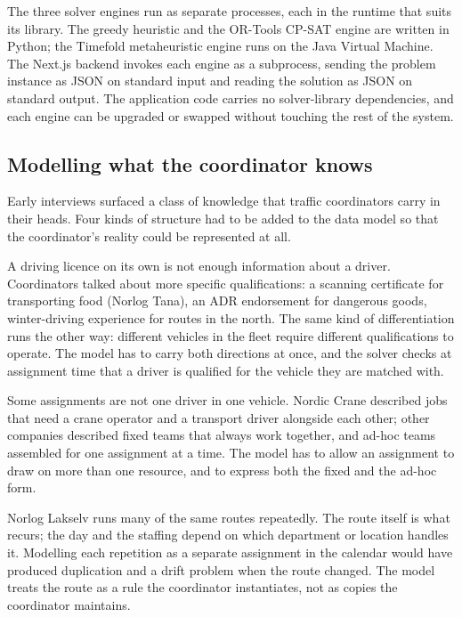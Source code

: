 The three solver engines run as separate processes, each in the runtime that suits its library. The greedy heuristic and the OR-Tools CP-SAT engine are written in Python; the Timefold metaheuristic engine runs on the Java Virtual Machine. The Next.js backend invokes each engine as a subprocess, sending the problem instance as JSON on standard input and reading the solution as JSON on standard output. The application code carries no solver-library dependencies, and each engine can be upgraded or swapped without touching the rest of the system.

\subsection{Modelling what the coordinator knows}
\label{sec:data-modelling}

Early interviews surfaced a class of knowledge that traffic coordinators carry in their heads. Four kinds of structure had to be added to the data model so that the coordinator's reality could be represented at all.

A driving licence on its own is not enough information about a driver. Coordinators talked about more specific qualifications: a scanning certificate for transporting food (Norlog Tana), an ADR endorsement for dangerous goods, winter-driving experience for routes in the north. The same kind of differentiation runs the other way: different vehicles in the fleet require different qualifications to operate. The model has to carry both directions at once, and the solver checks at assignment time that a driver is qualified for the vehicle they are matched with.

Some assignments are not one driver in one vehicle. Nordic Crane described jobs that need a crane operator and a transport driver alongside each other; other companies described fixed teams that always work together, and ad-hoc teams assembled for one assignment at a time. The model has to allow an assignment to draw on more than one resource, and to express both the fixed and the ad-hoc form.

Norlog Lakselv runs many of the same routes repeatedly. The route itself is what recurs; the day and the staffing depend on which department or location handles it. Modelling each repetition as a separate assignment in the calendar would have produced duplication and a drift problem when the route changed. The model treats the route as a rule the coordinator instantiates, not as copies the coordinator maintains.


